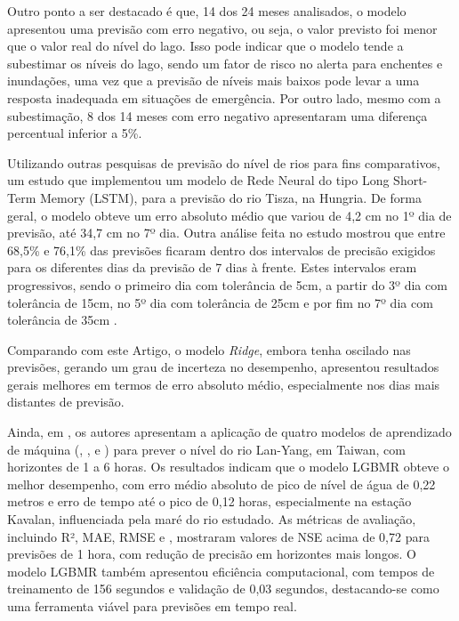 Outro ponto a ser destacado é que, 14 dos 24 meses analisados, o modelo apresentou uma previsão com erro negativo, ou seja, o valor previsto foi menor que o valor real do nível do lago. Isso pode indicar que o modelo tende a subestimar os níveis do lago, sendo um fator de risco no alerta para enchentes e inundações, uma vez que a previsão de níveis mais baixos pode levar a uma resposta inadequada em situações de emergência. Por outro lado, mesmo com a subestimação, 8 dos 14 meses com erro negativo apresentaram uma diferença percentual inferior a 5\%.

Utilizando outras pesquisas de previsão do nível de rios para fins comparativos, um estudo que implementou um modelo de Rede Neural do tipo Long Short-Term Memory (LSTM), para a previsão do rio Tisza, na Hungria. De forma geral, o modelo obteve um erro absoluto médio que variou de 4,2 cm no 1º dia de previsão, até 34,7 cm no 7º dia. Outra análise feita no estudo mostrou que entre 68,5\% e 76,1\% das previsões ficaram dentro dos intervalos de precisão exigidos para os diferentes dias da previsão de 7 dias à frente. Estes intervalos eram progressivos, sendo o primeiro dia com tolerância de 5cm, a partir do 3º dia com tolerância de 15cm, no 5º dia com tolerância de 25cm e por fim no 7º dia com tolerância de 35cm \cite{Vizi2023}.

Comparando com este Artigo, o modelo \textit{Ridge}, embora tenha oscilado nas previsões, gerando um grau de incerteza no desempenho, apresentou resultados gerais melhores em termos de erro absoluto médio, especialmente nos dias mais distantes de previsão.

Ainda, em \cite{Guo2021}, os autores apresentam a aplicação de quatro modelos de aprendizado de máquina (, ,  e ) para prever o nível do rio Lan-Yang, em Taiwan, com horizontes de 1 a 6 horas. Os resultados indicam que o modelo LGBMR obteve o melhor desempenho, com erro médio absoluto de pico de nível de água de 0,22 metros e erro de tempo até o pico de 0,12 horas, especialmente na estação Kavalan, influenciada pela maré do rio estudado. As métricas de avaliação, incluindo R², MAE, RMSE e , mostraram valores de NSE acima de 0,72 para previsões de 1 hora, com redução de precisão em horizontes mais longos. O modelo LGBMR também apresentou eficiência computacional, com tempos de treinamento de 156 segundos e validação de 0,03 segundos, destacando-se como uma ferramenta viável para previsões em tempo real.

